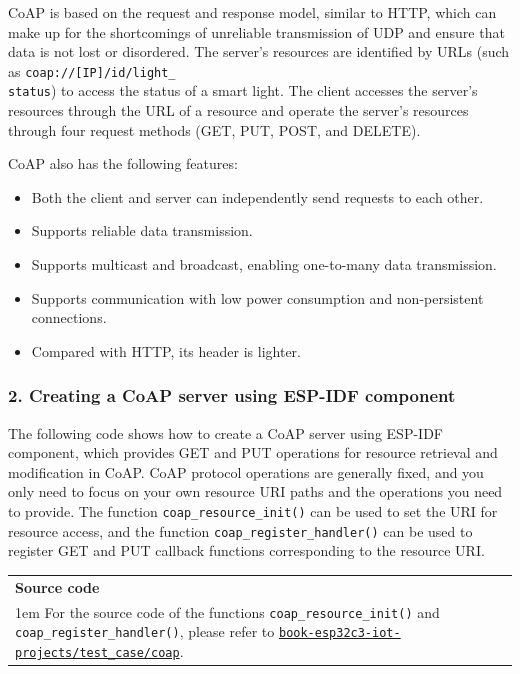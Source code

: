 \documentclass[a4paper,12pt,openany]{book}
\newcommand{\note}[2][NOTE]{ %
\vspace{6pt}
\begin{tabular}{b{\textwidth}}
\hline
\fontfamily{phv}\selectfont \textbf{#1}\\
\leftskip 1em #2\\
\hline
\end{tabular}
}
\begin{document}
CoAP is based on the request and response model, similar to HTTP, which can make up for the shortcomings of unreliable transmission of UDP and ensure that data is not lost or disordered. The server’s resources are identified by URLs (such as \verb|coap://[IP]/id/light_|\\ \verb|status|) to access the status of a smart light. The client accesses the server’s resources through the URL of a resource and operate the server’s resources through four request methods (GET, PUT, POST, and DELETE).

CoAP also has the following features:

\begin{itemize}[leftmargin=1.5em,noitemsep]
    \item Both the client and server can independently send requests to each other.
    \item Supports reliable data transmission.
    \item Supports multicast and broadcast, enabling one-to-many data transmission.
    \item Supports communication with low power consumption and non-persistent connections.
    \item Compared with HTTP, its header is lighter.
\end{itemize}

\subsubsection{2. Creating a CoAP server using ESP-IDF component}
The following code shows how to create a CoAP server using ESP-IDF component, which provides GET and PUT operations for resource retrieval and modification in CoAP. CoAP protocol operations are generally fixed, and you only need to focus on your own resource URI paths and the operations you need to provide. The function \verb|coap_resource_init()| can be used to set the URI for resource access, and the function \verb|coap_register_handler()| can be used to register GET and PUT callback functions corresponding to the resource URI.

\note[Source code]{For the source code of the functions \texttt{coap\_resource\_init()} and \texttt{coap\_register\_\newline handler()}, please refer to \href{https://github.com/espressif/book-esp32c3-iot-projects/tree/main/test_case/coap}{\texttt{book-esp32c3-iot-projects/test\_case/coap}}.}
\end{document}
